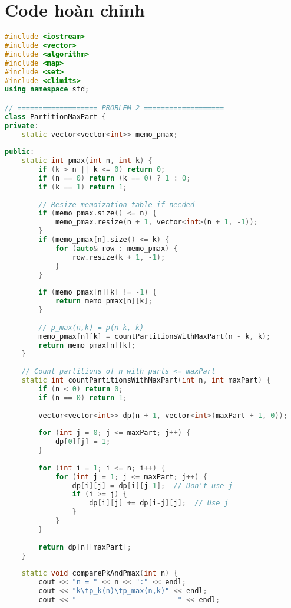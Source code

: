 \documentclass[12pt,a4paper]{article}
\theoremstyle{definition}
\begin{document}
\appendix
\section{Code hoàn chỉnh}

\begin{lstlisting}[language=C++, caption=Chương trình C++ hoàn chỉnh cho bài 2 \& 3]
#include <iostream>
#include <vector>
#include <algorithm>
#include <map>
#include <set>
#include <climits>
using namespace std;

// =================== PROBLEM 2 ===================
class PartitionMaxPart {
private:
    static vector<vector<int>> memo_pmax;
    
public:
    static int pmax(int n, int k) {
        if (k > n || k <= 0) return 0;
        if (n == 0) return (k == 0) ? 1 : 0;
        if (k == 1) return 1;
        
        // Resize memoization table if needed
        if (memo_pmax.size() <= n) {
            memo_pmax.resize(n + 1, vector<int>(n + 1, -1));
        }
        if (memo_pmax[n].size() <= k) {
            for (auto& row : memo_pmax) {
                row.resize(k + 1, -1);
            }
        }
        
        if (memo_pmax[n][k] != -1) {
            return memo_pmax[n][k];
        }
        
        // p_max(n,k) = p(n-k, k)
        memo_pmax[n][k] = countPartitionsWithMaxPart(n - k, k);
        return memo_pmax[n][k];
    }
    
    // Count partitions of n with parts <= maxPart
    static int countPartitionsWithMaxPart(int n, int maxPart) {
        if (n < 0) return 0;
        if (n == 0) return 1;
        
        vector<vector<int>> dp(n + 1, vector<int>(maxPart + 1, 0));
        
        for (int j = 0; j <= maxPart; j++) {
            dp[0][j] = 1;
        }
        
        for (int i = 1; i <= n; i++) {
            for (int j = 1; j <= maxPart; j++) {
                dp[i][j] = dp[i][j-1];  // Don't use j
                if (i >= j) {
                    dp[i][j] += dp[i-j][j];  // Use j
                }
            }
        }
        
        return dp[n][maxPart];
    }
    
    static void comparePkAndPmax(int n) {
        cout << "n = " << n << ":" << endl;
        cout << "k\tp_k(n)\tp_max(n,k)" << endl;
        cout << "------------------------" << endl;
        

\end{lstlisting}
\end{document}

